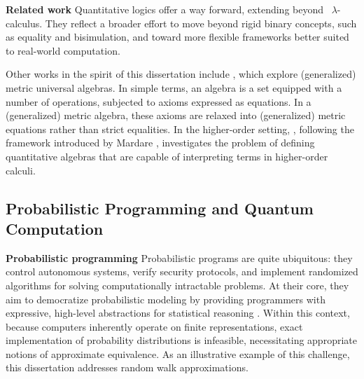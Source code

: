 \textbf{Related work}
Quantitative logics offer a way forward, extending beyond  $\lambda$-calculus\cite{caoQuantitativeLogicSoft2010, fanQuantitativeLogicSoft2017}. They reflect a broader effort to move beyond rigid binary concepts, such as equality and bisimulation, and toward more flexible frameworks better suited to real-world computation.

Other works in the spirit of this dissertation include \cite{mardare2016quantitative, mardare2017axiomatizability, mio24, jurka24}, which explore (generalized) metric universal algebras. In simple terms, an algebra is a set equipped with a number of operations, subjected to axioms expressed as equations. In a (generalized) metric algebra, these axioms are relaxed into (generalized) metric equations rather than strict equalities. In the higher-order setting, \cite{lago22}, following the framework introduced by Mardare \cite{mardare2016quantitative}, investigates the problem of defining quantitative algebras that are capable of interpreting terms in higher-order calculi. 


\subsection*{Probabilistic Programming and Quantum Computation }

\textbf{Probabilistic programming}
Probabilistic programs are quite ubiquitous: they control autonomous systems, verify security protocols, and implement randomized algorithms for solving computationally intractable problems. At their core, they aim to democratize probabilistic modeling by providing programmers with expressive, high-level abstractions for statistical reasoning \cite{bartheFoundationsProbabilisticProgramming2020}. 
Within this context, because computers inherently operate on finite representations, exact implementation of probability distributions is infeasible, necessitating appropriate notions of approximate equivalence. As an illustrative example of this challenge, this dissertation addresses random walk approximations.





